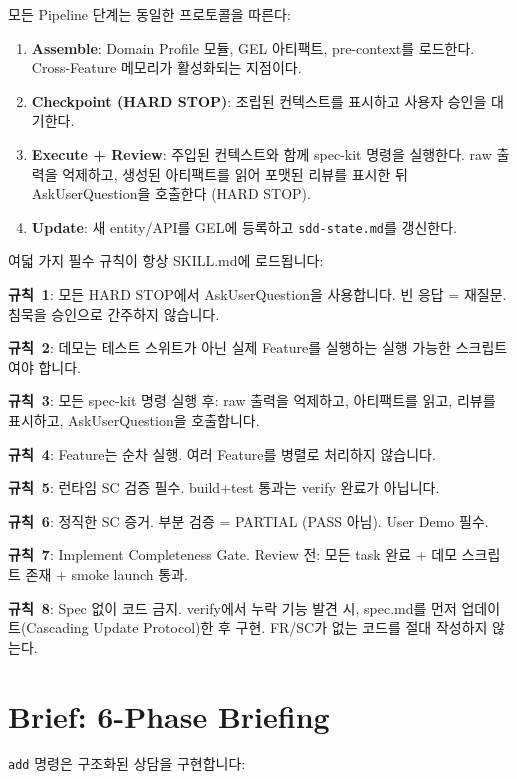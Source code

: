 \documentclass[11pt,a4paper,openright,twoside]{report}
\newcommand{\file}[1]{\texttt{#1}}
\begin{document}
모든 Pipeline 단계는 동일한 프로토콜을 따른다:

\begin{enumerate}
  \item \textbf{Assemble}: Domain Profile 모듈, GEL 아티팩트, pre-context를 로드한다. Cross-Feature 메모리가 활성화되는 지점이다.
  \item \textbf{Checkpoint (HARD STOP)}: 조립된 컨텍스트를 표시하고 사용자 승인을 대기한다.
  \item \textbf{Execute + Review}: 주입된 컨텍스트와 함께 spec-kit 명령을 실행한다. raw 출력을 억제하고, 생성된 아티팩트를 읽어 포맷된 리뷰를 표시한 뒤 AskUserQuestion을 호출한다 (HARD STOP).
  \item \textbf{Update}: 새 entity/API를 GEL에 등록하고 \file{sdd-state.md}를 갱신한다.
\end{enumerate}

\begin{dangerbox}[필수 규칙]
여덟 가지 필수 규칙이 항상 SKILL.md에 로드됩니다:

\textbf{규칙~1}: 모든 HARD STOP에서 AskUserQuestion을 사용합니다. 빈 응답 = 재질문. 침묵을 승인으로 간주하지 않습니다.

\textbf{규칙~2}: 데모는 테스트 스위트가 아닌 실제 Feature를 실행하는 실행 가능한 스크립트여야 합니다.

\textbf{규칙~3}: 모든 spec-kit 명령 실행 후: raw 출력을 억제하고, 아티팩트를 읽고, 리뷰를 표시하고, AskUserQuestion을 호출합니다.

\textbf{규칙~4}: Feature는 순차 실행. 여러 Feature를 병렬로 처리하지 않습니다.

\textbf{규칙~5}: 런타임 SC 검증 필수. build+test 통과는 verify 완료가 아닙니다.

\textbf{규칙~6}: 정직한 SC 증거. 부분 검증 = PARTIAL (PASS 아님). User Demo 필수.

\textbf{규칙~7}: Implement Completeness Gate. Review 전: 모든 task 완료 + 데모 스크립트 존재 + smoke launch 통과.

\textbf{규칙~8}: Spec 없이 코드 금지. verify에서 누락 기능 발견 시, spec.md를 먼저 업데이트(Cascading Update Protocol)한 후 구현. FR/SC가 없는 코드를 절대 작성하지 않는다.
\end{dangerbox}

\section{Brief: 6-Phase Briefing}

\texttt{add} 명령은 구조화된 상담을 구현합니다:
\end{document}
